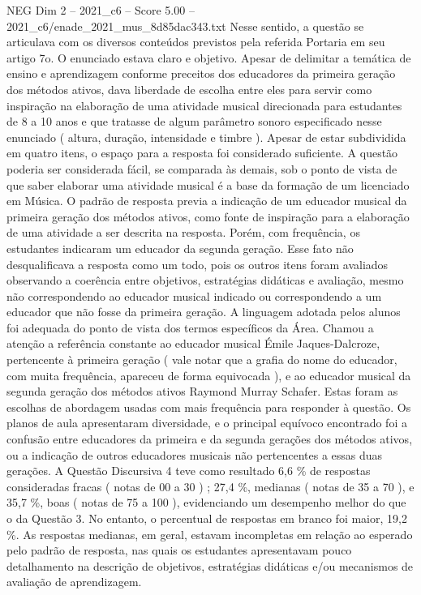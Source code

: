 \begin{textsample}{NEG Dim 2 – 2021\_c6 – Score 5.00 – 2021\_c6/enade\_2021\_mus\_8d85dac343.txt}
Nesse sentido, a questão se articulava com os diversos conteúdos previstos pela referida Portaria em seu artigo 7o.
O enunciado estava claro e objetivo.
Apesar de delimitar a temática de ensino e aprendizagem conforme preceitos dos educadores da primeira geração dos métodos ativos, dava liberdade de escolha entre eles para servir como inspiração na elaboração de uma atividade musical direcionada para estudantes de 8 a 10 anos e que tratasse de algum parâmetro sonoro especificado nesse enunciado ( altura, duração, intensidade e timbre ).
Apesar de estar subdividida em quatro itens, o espaço para a resposta foi considerado suficiente.
A questão poderia ser considerada fácil, se comparada às demais, sob o ponto de vista de que saber elaborar uma atividade musical é a base da formação de um licenciado em Música.
O padrão de resposta previa a indicação de um educador musical da primeira geração dos métodos ativos, como fonte de inspiração para a elaboração de uma atividade a ser descrita na resposta.
Porém, com frequência, os estudantes indicaram um educador da segunda geração.
Esse fato não desqualificava a resposta como um todo, pois os outros itens foram avaliados observando a coerência entre objetivos, estratégias didáticas e avaliação, mesmo não correspondendo ao educador musical indicado ou correspondendo a um educador que não fosse da primeira geração.
A linguagem adotada pelos alunos foi adequada do ponto de vista dos termos específicos da Área.
Chamou a atenção a referência constante ao educador musical Émile Jaques-Dalcroze, pertencente à primeira geração ( vale notar que a grafia do nome do educador, com muita frequência, apareceu de forma equivocada ), e ao educador musical da segunda geração dos métodos ativos Raymond Murray Schafer.
Estas foram as escolhas de abordagem usadas com mais frequência para responder à questão.
Os planos de aula apresentaram diversidade, e o principal equívoco encontrado foi a confusão entre educadores da primeira e da segunda gerações dos métodos ativos, ou a indicação de outros educadores musicais não pertencentes a essas duas gerações.
A Questão Discursiva 4 teve como resultado 6,6 \% de respostas consideradas fracas ( notas de 00 a 30 ) ; 27,4 \%, medianas ( notas de 35 a 70 ), e 35,7 \%, boas ( notas de 75 a 100 ), evidenciando um desempenho melhor do que o da Questão 3.
No entanto, o percentual de respostas em branco foi maior, 19,2 \%.
As respostas medianas, em geral, estavam incompletas em relação ao esperado pelo padrão de resposta, nas quais os estudantes apresentavam pouco detalhamento na descrição de objetivos, estratégias didáticas e/ou mecanismos de avaliação de aprendizagem.

\end{textsample}
